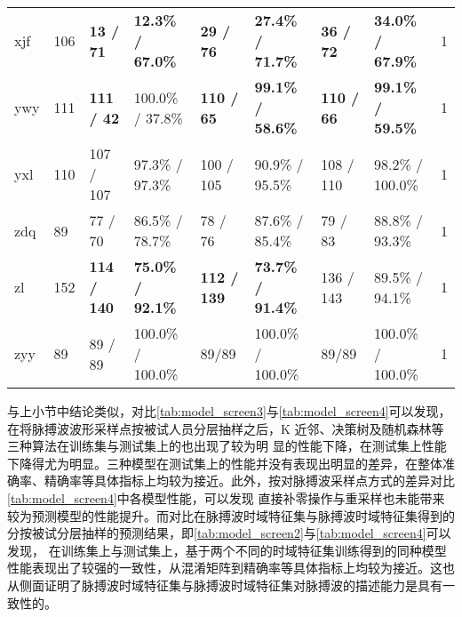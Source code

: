 \begin{landscape}
\begin{longtable}{m{2cm}<{\centering}m{2cm}<{\centering}m{2cm}<{\centering}m{2cm}<{\centering}m{2cm}<{\centering}m{2cm}<{\centering}m{2cm}<{\centering}m{2cm}<{\centering}m{2cm}<{\centering}}
            xjf                   & 106                   & \textbf{13 / 71}         & \textbf{12.3\% / 67.0\%}     & \textbf{29 / 76}         & \textbf{27.4\% / 71.7\%}    & \textbf{36 / 72}         & \textbf{34.0\% / 67.9\%}       & 1                                                                      \\
            ywy                   & 111                   & \textbf{111 / 42}        & 100.0\% / 37.8\%     & \textbf{110 / 65}        & \textbf{99.1\% / 58.6\%}    & \textbf{110 / 66}        & \textbf{99.1\% / 59.5\%}    & 1                                                                      \\
            yxl                   & 110                   & 107 / 107        & 97.3\% / 97.3\%   & 100 / 105        & 90.9\% / 95.5\%    & 108 / 110        & 98.2\% / 100.0\%     & 1                                                                      \\
            zdq                   & 89                    & 77 / 70         & 86.5\% / 78.7\%     & 78 / 76         & 87.6\% / 85.4\%     & 79 / 83         & 88.8\% / 93.3\%      & 1                                                                      \\
            zl                    & 152                   & \textbf{114 / 140}        & \textbf{75.0\% / 92.1\%}     & \textbf{112 / 139}         & \textbf{73.7\% / 91.4\%}     & 136 / 143        & 89.5\% / 94.1\%      & 1                                                                      \\
            zyy                   & 89                    & 89 / 89         & 100.0\% / 100.0\%    & 89/89         & 100.0\% / 100.0\%    & 89/89         & 100.0\% / 100.0\%    & 1                                                                       \\    
      \end{longtable}
\end{landscape}

与上小节中结论类似，对比\autoref{tab:model_screen3}与\autoref{tab:model_screen4}可以发现，在将脉搏波波形采样点按被试人员分层抽样之后，K 近邻、决策树及随机森林等三种算法在训练集与测试集上的也出现了较为明
显的性能下降，在测试集上性能下降得尤为明显。三种模型在测试集上的性能并没有表现出明显的差异，在整体准确率、精确率等具体指标上均较为接近。此外，按对脉搏波采样点方式的差异对比\autoref{tab:model_screen4}中各模型性能，可以发现
直接补零操作与重采样也未能带来较为预测模型的性能提升。而对比在脉搏波时域特征集与脉搏波时域特征集得到的分按被试分层抽样的预测结果，即\autoref{tab:model_screen2}与\autoref{tab:model_screen4}可以发现，
在训练集上与测试集上，基于两个不同的时域特征集训练得到的同种模型性能表现出了较强的一致性，从混淆矩阵到精确率等具体指标上均较为接近。这也从侧面证明了脉搏波时域特征集与脉搏波时域特征集对脉搏波的描述能力是具有一致性的。

